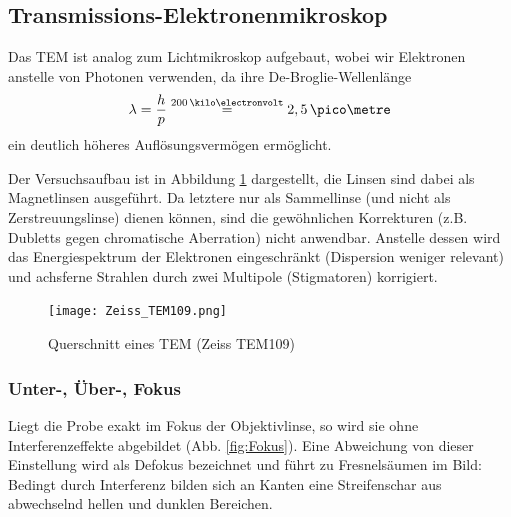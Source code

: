 \newpage
\subsection{Transmissions-Elektronenmikroskop}
Das TEM ist analog zum Lichtmikroskop aufgebaut, wobei wir Elektronen anstelle von Photonen verwenden, da ihre De-Broglie-Wellenlänge
\begin{equation}
\lambda = \frac{h}{p} \stackrel{200\,\kilo\electronvolt}{=} 2,5\,\pico\metre
\end{equation}
ein deutlich höheres Auflösungsvermögen ermöglicht.

Der Versuchsaufbau ist in Abbildung \ref{fig:setup} dargestellt, die Linsen sind dabei als Magnetlinsen ausgeführt. Da letztere nur als Sammellinse (und nicht als Zerstreuungslinse) dienen können, sind die gewöhnlichen Korrekturen (z.B. Dubletts gegen chromatische Aberration) nicht anwendbar. Anstelle dessen wird das Energiespektrum der Elektronen eingeschränkt (Dispersion weniger relevant) und achsferne Strahlen durch zwei Multipole (Stigmatoren) korrigiert.


\begin{figure}[h]
	\centering
	\texttt{[image: Zeiss\_TEM109.png]}
	\caption{Querschnitt eines TEM (Zeiss TEM109) \cite{lit:tueb}}
	\label{fig:setup}
\end{figure}

\subsubsection{Unter-, Über-, Fokus}
Liegt die Probe exakt im Fokus der Objektivlinse, so wird sie ohne Interferenzeffekte abgebildet (Abb. \ref{fig:Fokus}). Eine Abweichung von dieser Einstellung wird  als Defokus bezeichnet und führt zu Fresnelsäumen im Bild: Bedingt durch Interferenz bilden sich an Kanten eine Streifenschar aus abwechselnd hellen und dunklen Bereichen.

